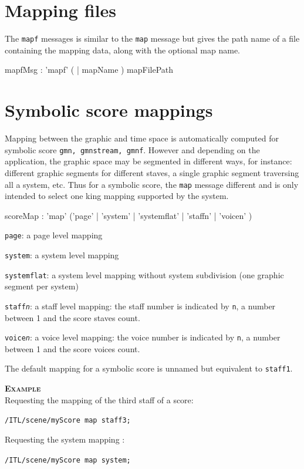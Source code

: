 \documentclass[a4paper,twoside]{report}
\newcommand{\sublevel}[1]	{\section{#1}}
\newcommand{\OSC}[1]		{\texttt{#1}}
\newcommand{\example}		{\textbf{\hspace{-1.5cm}\textbf{\textsc{Example }}}}
\let\olditemize\itemize
\let\oldenditemize\enditemize
\renewenvironment{itemize} 	{\olditemize \setlength{\itemsep}{1mm}}{\oldenditemize}
\newcommand{\sample}	[1]			{\vspace{-2mm}\begin{center}\colorbox{mygrey}{
								\begin{minipage}[t]{0.9\columnwidth} 
								{\small \texttt{#1}}
								\end{minipage}}\end{center}}
\begin{document}
\sublevel{Mapping files}
\label{mapFileMsg}
The \OSC{mapf} messages is similar to the \OSC{map} message but gives the path name of a file containing the mapping data, along with the optional map name.
\begin{rail}
mapfMsg : 'mapf' ( | mapName ) mapFilePath
\end{rail}



\sublevel{Symbolic score mappings}
\label{guidomap}

Mapping between the graphic and time space is automatically computed for symbolic score \OSC{gmn, gmnstream, gmnf}. However and depending on the application, the graphic space may be segmented in different ways, for instance: different graphic segments for different staves, a single graphic segment traversing all a system, etc. Thus for a symbolic score, the \OSC{map} message different and is only intended to select one king mapping supported by the system.

\begin{rail}
scoreMap : 'map' ('page' | 'system' | 'systemflat' | 'staffn' | 'voicen' )
\end{rail}

\begin{itemize}
\item \OSC{page}: a page level mapping
\item \OSC{system}: a system level mapping
\item \OSC{systemflat}: a system level mapping without system subdivision (one graphic segment per system)
\item \OSC{staff\textit{n}}: a staff level mapping: the staff number is indicated by \OSC{n}, a number between 1 and the score staves count.
\item \OSC{voice\textit{n}}: a voice level mapping: the voice number is indicated by \OSC{n}, a number between 1 and the score voices count.
\end{itemize}

The default mapping for a symbolic score is unnamed but equivalent to \OSC{staff1}.

\example \\
Requesting the mapping of the third staff of a score:
\sample{/ITL/scene/myScore map staff3;}
Requesting the system mapping :
\sample{/ITL/scene/myScore map system;}
\end{document}
